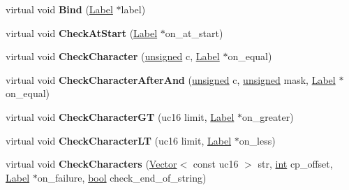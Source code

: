 \begin{DoxyCompactItemize}
virtual void {\bfseries Bind} (\mbox{\hyperlink{classv8_1_1internal_1_1Label}{Label}} $\ast$label)
\item 
\mbox{\label{classv8_1_1internal_1_1RegExpMacroAssemblerARM64_a1bfcd2bbf6756e724704afb5ab891769}} 
virtual void {\bfseries Check\+At\+Start} (\mbox{\hyperlink{classv8_1_1internal_1_1Label}{Label}} $\ast$on\+\_\+at\+\_\+start)
\item 
\mbox{\label{classv8_1_1internal_1_1RegExpMacroAssemblerARM64_a36e9329f18fa4c2e79a69aeef80f4366}} 
virtual void {\bfseries Check\+Character} (\mbox{\hyperlink{classunsigned}{unsigned}} c, \mbox{\hyperlink{classv8_1_1internal_1_1Label}{Label}} $\ast$on\+\_\+equal)
\item 
\mbox{\label{classv8_1_1internal_1_1RegExpMacroAssemblerARM64_a887aaba0eaff959c5ca976eb38d5726a}} 
virtual void {\bfseries Check\+Character\+After\+And} (\mbox{\hyperlink{classunsigned}{unsigned}} c, \mbox{\hyperlink{classunsigned}{unsigned}} mask, \mbox{\hyperlink{classv8_1_1internal_1_1Label}{Label}} $\ast$on\+\_\+equal)
\item 
\mbox{\label{classv8_1_1internal_1_1RegExpMacroAssemblerARM64_af627b37fa5f444bb22813eed86209620}} 
virtual void {\bfseries Check\+Character\+GT} (uc16 limit, \mbox{\hyperlink{classv8_1_1internal_1_1Label}{Label}} $\ast$on\+\_\+greater)
\item 
\mbox{\label{classv8_1_1internal_1_1RegExpMacroAssemblerARM64_a198be2138f84cf7d8ee56f796882305e}} 
virtual void {\bfseries Check\+Character\+LT} (uc16 limit, \mbox{\hyperlink{classv8_1_1internal_1_1Label}{Label}} $\ast$on\+\_\+less)
\item 
\mbox{\label{classv8_1_1internal_1_1RegExpMacroAssemblerARM64_a768a25dbe284350b48a9bbb35dc5ada3}} 
virtual void {\bfseries Check\+Characters} (\mbox{\hyperlink{classv8_1_1internal_1_1Vector}{Vector}}$<$ const uc16 $>$ str, \mbox{\hyperlink{classint}{int}} cp\+\_\+offset, \mbox{\hyperlink{classv8_1_1internal_1_1Label}{Label}} $\ast$on\+\_\+failure, \mbox{\hyperlink{classbool}{bool}} check\+\_\+end\+\_\+of\+\_\+string)

\end{DoxyCompactItemize}
